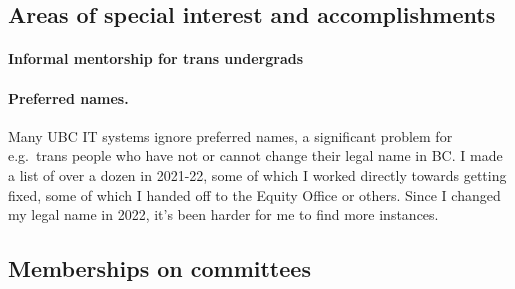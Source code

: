 \documentclass[10pt]{article}
\begin{document}
\subsection{Areas of special interest and accomplishments}



\paragraph{Informal mentorship for trans undergrads}

\paragraph{Preferred names.}
{%
Many UBC IT systems ignore preferred names,
a significant problem for e.g.\ trans people who have not or cannot change their legal name in BC.
I made a list of over a dozen in 2021-22,
some of which I worked directly towards getting fixed,
some of which I handed off to the Equity Office or others.
Since I changed my legal name in 2022, it's been harder for me to find more instances.
}


\subsection{Memberships on committees} %
\end{document}
